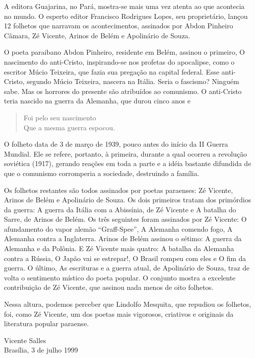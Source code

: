 A editora Guajarina, no Pará, mostra-se mais uma vez atenta ao que
acontecia no mundo. O esperto editor Francisco Rodrigues Lopes, seu
proprietário, lançou 12 folhetos que narravam os acontecimentos,
assinados por Abdon Pinheiro Câmara, Zé Vicente, Arinos de Belém e
Apolinário de Souza.

O poeta paraibano Abdon Pinheiro, residente em Belém, assinou o
primeiro, O nascimento do anti-Cristo, inspirando-se nos profetas do
apocalipse, como o escritor Múcio Teixeira, que fazia sua pregação na
capital federal. Esse anti-Cristo, segundo Múcio Teixeira, nascera na
Itália. Seria o fascismo? Ninguém sabe. Mas os horrores do presente
são atribuídos ao comunismo. O anti-Cristo teria nascido na guerra da
Alemanha, que durou cinco anos e

\begin{verse}
Foi pelo seu nascimento\\
Que a mesma guerra espocou.
\end{verse}

O folheto data de 3 de março de 1939, pouco antes do início da II
Guerra Mundial. Ele se refere, portanto, à primeira, durante a qual
ocorreu a revolução soviética (1917), gerando reações em toda a parte
e a idéia bastante difundida de que o comunismo corromperia a
sociedade, destruindo a família. 

Os folhetos restantes são todos assinados por poetas paraenses: Zé
Vicente, Arinos de Belém e Apolinário de Souza. Os dois primeiros
tratam dos primórdios da guerra: A guerra da Itália com a Abissínia,
de Zé Vicente e A batalha do Sarre, de Arinos de Belém. Os três
seguintes foram assinados por Zé Vicente: O afundamento do vapor
alemão “Graff-Spee”, A Alemanha comendo fogo, A Alemanha contra a
Inglaterra. Arinos de Belém assinou o sétimo: A guerra da Alemanha e
da Polônia. E Zé Vicente mais quatro: A batalha da Alemanha contra a
Rússia, O Japão vai se estrepar!, O Brasil rompeu com eles e O fim da
guerra. O último, As escrituras e a guerra atual, de Apolinário de
Souza, traz de volta o sentimento místico do poeta popular. O
conjunto mostra a excelente contribuição de Zé Vicente, que assinou
nada menos de oito folhetos.

Nessa altura, podemos perceber que Lindolfo Mesquita, que repudiou os
folhetos, foi, como Zé Vicente, um dos poetas mais vigorosos,
criativos e originais da literatura popular paraense.

\begin{flushright}\begin{minipage}{.8\textwidth}
Vicente Salles
\\
Brasília, 3 de julho 1999
\end{minipage}\end{flushright}
